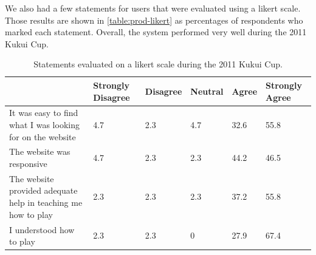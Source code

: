 We also had a few statements for users that were evaluated using a likert scale. Those results are shown in \autoref{table:prod-likert} as percentages of respondents who marked each statement. Overall, the system performed very well during the 2011 Kukui Cup. 

\begin{table}[t]
	\begin{tabular}{| p{6cm} || l | l | l | l | l |}
		\hline
		& Strongly Disagree & Disagree & Neutral & Agree & Strongly Agree \\
		\hline
		It was easy to find what I was looking for on the website & 4.7 & 2.3 & 4.7 & 32.6 & 55.8 \\
		The website was responsive & 4.7 & 2.3 & 2.3 & 44.2 & 46.5 \\
		The website provided adequate help in teaching me how to play & 2.3 & 2.3 & 2.3 & 37.2 & 55.8 \\
		I understood how to play & 2.3 & 2.3 & 0 & 27.9 & 67.4 \\
		\hline
	\end{tabular}
	\caption{Statements evaluated on a likert scale during the 2011 Kukui Cup.}
	\label{table:prod-likert}
\end{table}